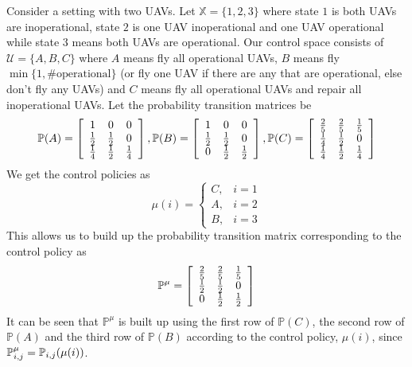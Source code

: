 \begin{example}
Consider a setting with two UAVs.
Let $\mathbb{X}=\{1,2,3\}$ where state $1$ is both UAVs are inoperational, state $2$ is one UAV inoperational and one UAV operational while state $3$ means both UAVs are operational.
Our control space consists of $\mathcal{U} = \{A,B,C\}$ where $A$ means fly all operational UAVs, $B$ means fly $\min\{1, \#\text{operational}\}$ (or fly one UAV if there are any that are operational, else don't fly any UAVs) and $C$ means fly all operational UAVs and repair all inoperational UAVs.
Let the probability transition matrices be
\begin{align*}
\begin{split}
\mathbb{P}(A) = \left[\begin{array}{c c c} 1 & 0 & 0 \\ \frac{1}{2} & \frac{1}{2} & 0 \\ \frac{1}{4} & \frac{1}{2} & \frac{1}{4} \end{array}\right],
\mathbb{P} (B) = \left[\begin{array}{c c c} 1 & 0 & 0 \\ \frac{1}{2} & \frac{1}{2} & 0 \\ 0 & \frac{1}{2} & \frac{1}{2} \end{array}\right],
\mathbb{P} (C) = \left[\begin{array}{c c c} \frac{2}{5} & \frac{2}{5} & \frac{1}{5} \\ \frac{1}{4} & \frac{1}{2} & 0 \\ \frac{1}{4} & \frac{1}{2} & \frac{1}{4} \end{array}\right]
\end{split}
\end{align*}
We get the control policies as
$$\mu(i) = \begin{cases} C, & i=1 \\ A, & i=2 \\ B, & i=3 \end{cases}$$
This allows us to build up the probability transition matrix corresponding to the control policy as
$$\mathbb{P}^\mu = \left[\begin{array}{c c c} \frac{2}{5} & \frac{2}{5} & \frac{1}{5} \\ \frac{1}{2} & \frac{1}{2} & 0 \\ 0 & \frac{1}{2} & \frac{1}{2} \end{array}\right]$$
It can be seen that $\mathbb{P}^\mu$ is built up using the first row of $\mathbb{P} (C)$, the second row of $\mathbb{P} (A)$ and the third row of $\mathbb{P} (B)$ according to the control policy, $\mu(i)$, since $\mathbb{P}_{i,j}^\mu=\mathbb{P}_{i,j}(\mu(i))$.


\end{example}
